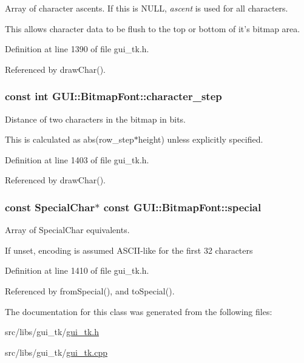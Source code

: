 Array of character ascents. If this is N\-U\-L\-L, {\itshape ascent\/} is used for all characters. 

This allows character data to be flush to the top or bottom of it's bitmap area. 

Definition at line 1390 of file gui\-\_\-tk.\-h.



Referenced by draw\-Char().

\hypertarget{classGUI_1_1BitmapFont_a27146558fd76b2ac1c2dc7133b23f4ce}{
\subsubsection[{character\-\_\-step}]{\setlength{\rightskip}{0pt plus 5cm}const int {\bf G\-U\-I\-::\-Bitmap\-Font\-::character\-\_\-step}}}\label{classGUI_1_1BitmapFont_a27146558fd76b2ac1c2dc7133b23f4ce}


Distance of two characters in the bitmap in bits. 

This is calculated as abs(row\-\_\-step$\ast$height) unless explicitly specified. 

Definition at line 1403 of file gui\-\_\-tk.\-h.



Referenced by draw\-Char().

\hypertarget{classGUI_1_1BitmapFont_a46f912c496e902dfc614e25261599718}{
\subsubsection[{special}]{\setlength{\rightskip}{0pt plus 5cm}const {\bf Special\-Char}$\ast$ const {\bf G\-U\-I\-::\-Bitmap\-Font\-::special}}}\label{classGUI_1_1BitmapFont_a46f912c496e902dfc614e25261599718}


Array of Special\-Char equivalents. 

If unset, encoding is assumed A\-S\-C\-I\-I-\/like for the first 32 characters 

Definition at line 1410 of file gui\-\_\-tk.\-h.



Referenced by from\-Special(), and to\-Special().



The documentation for this class was generated from the following files\-:\begin{DoxyCompactItemize}
\item 
src/libs/gui\-\_\-tk/\hyperlink{gui__tk_8h}{gui\-\_\-tk.\-h}\item 
src/libs/gui\-\_\-tk/\hyperlink{gui__tk_8cpp}{gui\-\_\-tk.\-cpp}\end{DoxyCompactItemize}

